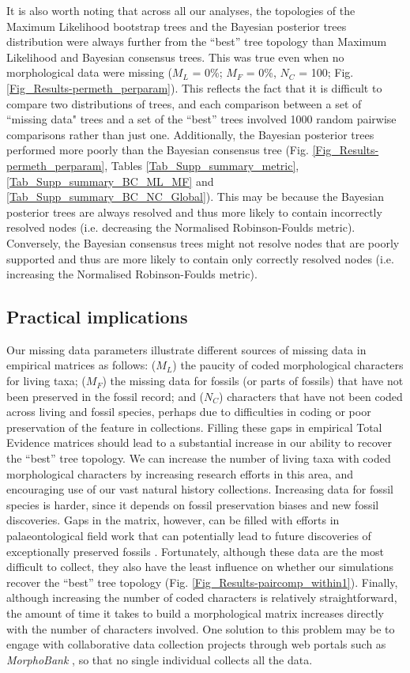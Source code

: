 It is also worth noting that across all our analyses, the topologies of the Maximum Likelihood bootstrap trees and the Bayesian posterior trees distribution were always further from the ``best'' tree topology than Maximum Likelihood and Bayesian consensus trees.
This was true even when no morphological data were missing ($M_{L}$ = 0\%; $M_{F}$ = 0\%, $N_{C}$ = 100; Fig. \ref{Fig_Results-permeth_perparam}).
This reflects the fact that it is difficult to compare two distributions of trees, and each comparison between a set of ``missing data" trees and a set of the ``best'' trees involved 1000 random pairwise comparisons rather than just one.
Additionally, the Bayesian posterior trees performed more poorly than the Bayesian consensus tree (Fig. \ref{Fig_Results-permeth_perparam}, Tables \ref{Tab_Supp_summary_metric}, \ref{Tab_Supp_summary_BC_ML_MF} and \ref{Tab_Supp_summary_BC_NC_Global}).
This may be because the Bayesian posterior trees are always resolved and thus more likely to contain incorrectly resolved nodes (i.e. decreasing the Normalised Robinson-Foulds metric).
Conversely, the Bayesian consensus trees might not resolve nodes that are poorly supported and thus are more likely to contain only correctly resolved nodes (i.e. increasing the Normalised Robinson-Foulds metric).


\subsection{Practical implications}
Our missing data parameters illustrate different sources of missing data in empirical matrices as follows: ($M_{L}$) the paucity of coded morphological characters for living taxa; ($M_{F}$) the missing data for fossils (or parts of fossils) that have not been preserved in the fossil record; and ($N_{C}$) characters that have not been coded across living and fossil species, perhaps due to difficulties in coding or poor preservation of the feature in collections.
Filling these gaps in empirical Total Evidence matrices should lead to a substantial increase in our ability to recover the ``best'' tree topology.
We can increase the number of living taxa with coded morphological characters by increasing research efforts in this area, and encouraging use of our vast natural history collections.
Increasing data for fossil species is harder, since it depends on fossil preservation biases and new fossil discoveries.
Gaps in the matrix, however, can be filled with efforts in palaeontological field work that can potentially lead to future discoveries of exceptionally preserved fossils \citep[e.g.][]{ni2013oldest}.
Fortunately, although these data are the most difficult to collect, they also have the least influence on whether our simulations recover the ``best'' tree topology (Fig. \ref{Fig_Results-paircomp_within1}).
Finally, although increasing the number of coded characters is relatively straightforward, the amount of time it takes to build a morphological matrix increases directly with the number of characters involved.
One solution to this problem may be to engage with collaborative data collection projects through web portals such as \textit{MorphoBank} \citep{morphobank}, so that no single individual collects all the data.

